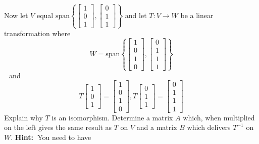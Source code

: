 \documentclass{ximera}
\begin{document}
\begin{problem}\label{prb:10.85} Now let $V$ equal $\mbox{span}\left\{ \left[
\begin{array}{c}
1 \\
0 \\
1
\end{array}
\right] ,\left[
\begin{array}{c}
0 \\
1 \\
1
\end{array}
\right] \right\} $ and let $T:V\rightarrow W$ be a linear transformation
where
\begin{equation*}
W=\mbox{span}\left\{ \left[
\begin{array}{c}
1 \\
0 \\
1 \\
0
\end{array}
\right] ,\left[
\begin{array}{c}
0 \\
1 \\
1 \\
1
\end{array}
\right] \right\}
\end{equation*}
$\ $\ and
\begin{equation*}
T\left[
\begin{array}{c}
1 \\
0 \\
1
\end{array}
\right] =\left[
\begin{array}{c}
1 \\
0 \\
1 \\
0
\end{array}
\right] ,T\left[
\begin{array}{c}
0 \\
1 \\
1
\end{array}
\right] =\left[
\begin{array}{c}
0 \\
1 \\
1 \\
1
\end{array}
\right]
\end{equation*}
Explain why $T$ is an isomorphism. Determine a matrix $A$ which, when
multiplied on the left gives the same result as $T$ on $V$ and a matrix $B$
which delivers $T^{-1}$ on $W$. \textbf{Hint:\ }You need to have
\begin{equation*}

\end{equation*}
\end{problem}
\end{document}
